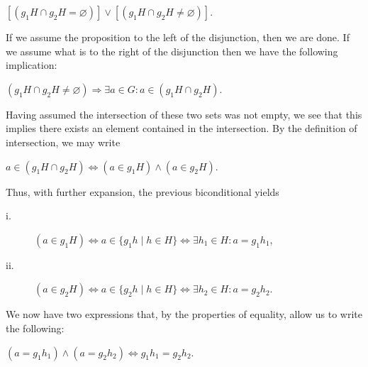 \documentclass[12pt, a4paper]{article}
\begin{document}
\vspace{10mm}

\centerline{$[(g_1 H\cap g_2 H=\varnothing)]\vee [(g_1 H\cap g_2 H\neq \varnothing)]$.}

\vspace{10mm}

If we assume the proposition to the left of the disjunction, then we are done. If we assume what is to the right of the disjunction then we have the following implication:\hfill

\vspace{10mm}

\centerline{$(g_1 H\cap g_2 H\neq \varnothing) \Longrightarrow \exists a\in G\colon a\in (g_1 H\cap g_2 H)$.}

\vspace{16mm}

Having assumed the intersection of these two sets was not empty, we see that this implies there exists an element contained in the intersection. By the definition of intersection, we may write

\vspace{10mm}

\centerline{$a\in (g_1 H\cap g_2 H)\Longleftrightarrow (a\in g_1 H)\wedge (a\in g_2 H)$.}

\vspace{10mm}

Thus, with further expansion, the previous biconditional yields

\vspace{8mm}

\begin{description}
\item[i.] $(a\in g_1 H)\Longleftrightarrow a\in \{g_1 h\mid h\in H\}\Longleftrightarrow \exists h_1 \in H\colon a=g_1 h_1$,
\item[ii.] $(a\in g_2 H)\Longleftrightarrow a\in \{g_2 h\mid h\in H\}\Longleftrightarrow \exists h_2 \in H\colon a=g_2 h_2$.
\end{description}

\vspace{10mm}

We now have two expressions that, by the properties of equality, allow us to write the following:\hfill

\vspace{10mm}

\centerline{$(a=g_1 h_1)\wedge (a=g_2 h_2)\Longleftrightarrow g_1 h_1=g_2 h_2$.}

\vspace{10mm}
\end{document}
